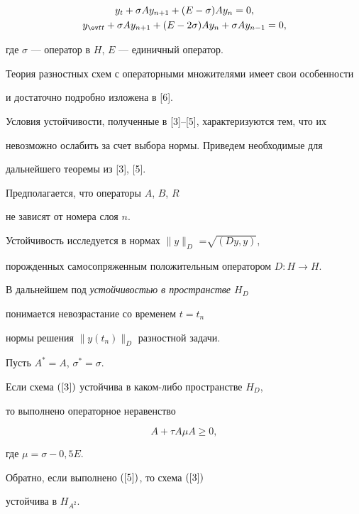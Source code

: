 \begin{gather}


\label{3}


y_{t} +\sigma Ay_{n+1}+(E-\sigma) Ay_{n}=0, \\


%


\label{4}


y_{\ov tt} +\sigma Ay_{n+1}+(E-2\sigma) Ay_{n} + \sigma Ay_{n-1} =0,


\end{gather}


где $\sigma$ --- оператор в $H$, $E$ --- единичный оператор.


Теория разностных схем с операторными множителями имеет свои особенности


и достаточно подробно изложена в [6].





Условия устойчивости, полученные в [3]--[5], характеризуются тем, что их


невозможно ослабить за счет выбора нормы. Приведем необходимые для


дальнейшего теоремы из [3], [5].


Предполагается, что операторы $A$, $B$, $R$


не зависят от номера слоя $n$.


Устойчивость исследуется в нормах $\|y\|_{D}$ =$\sqrt{(Dy,y)}$,


порожденных самосопряженным положительным оператором $D:H\to H$.


В дальнейшем под {\it устойчивостью в пространстве $H_{D}$}


понимается невозрастание со временем $t=t_{n}$


нормы решения $\|y(t_{n})\|_{D}$ разностной задачи.





\begin{thm}


Пусть $A^{*}=A$, $\sigma^{*}=\sigma$.


Если схема $(\ref{3})$ устойчива в каком-либо пространстве $H_{D}$,


то выполнено операторное неравенство


\begin{equation}


\label{5}


A+\tau A\mu A\ge 0,


\end{equation}


где $\mu=\sigma -0,5E$.


Обратно, если выполнено $(\ref{5})$, то схема $(\ref{3})$


устойчива в $H_{A^{2}}$.


\end{thm}






